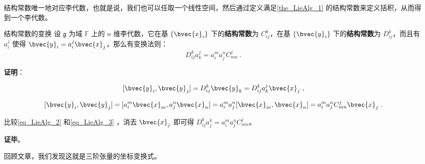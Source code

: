 结构常数唯一地对应李代数，也就是说，我们也可以任取一个线性空间，然后通过定义满足\autoref{the_LieAlg_1} 的结构常数来定义括积，从而得到一个李代数。

\begin{theorem}{结构常数的变换}
设 $\mathfrak{g}$ 为域 $\mathbb{F}$ 上的 $n$ 维李代数，它在基 $\{\bvec{x}_i\}$ 下的\textbf{结构常数}为 $C^k_{ij}$，在基 $\{\bvec{y}_i\}$ 下的\textbf{结构常数}为 $D^k_{ij}$，而且有$a_i^j$ 使得 $\bvec{y}_i=a_i^j\bvec{x}_j$，那么有变换法则：
\begin{equation}
D_{ij}^k a_k^j=a_i^m a_j^n C^j_{mn}~.
\end{equation}

\end{theorem}

\textbf{证明}：

\begin{equation}\label{eq_LieAlg_2}
[\bvec{y}_i, \bvec{y}_j] = D_{ij}^k \bvec{y}_k = D_{ij}^k a_k^j \bvec{x}_j~,
\end{equation}

\begin{equation}\label{eq_LieAlg_3}
[\bvec{y}_i, \bvec{y}_j]=[a_i^m \bvec{x}_m, a_j^n \bvec{x}_n]=a_i^m a_j^n[\bvec{x}_m, \bvec{x}_n]=a_i^m a_j^n C^j_{mn} \bvec{x}_j~.
\end{equation}

比较\autoref{eq_LieAlg_2} 和\autoref{eq_LieAlg_3} ，消去 $\bvec{x}_j$ 即可得 $D_{ij}^k a^k_j = a_i^m a_j^n C^j_{mn}$。

\textbf{证毕}。

回顾文章，我们发现这就是三阶张量的坐标变换式。







